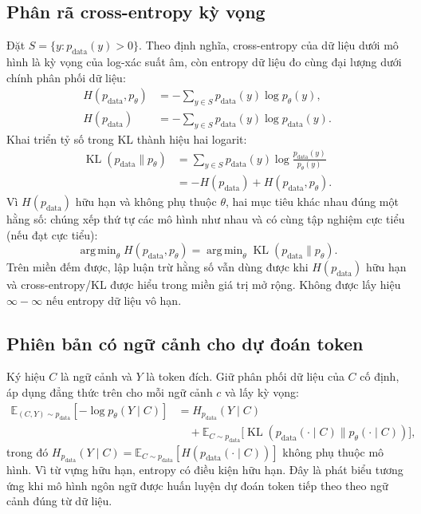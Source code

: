 \documentclass[11pt,a4paper]{article}
\DeclareMathOperator{\KL}{KL}
\DeclareMathOperator*{\argmin}{arg\,min}
\newcommand{\E}{\mathbb{E}}
\newcommand{\pdata}{p_{\mathrm{data}}}
\begin{document}
\subsection*{Phân rã cross-entropy kỳ vọng}
Đặt $S=\{y:\pdata(y)>0\}$. Theo định nghĩa, cross-entropy của dữ liệu dưới mô hình là kỳ vọng của log-xác suất âm, còn entropy dữ liệu đo cùng đại lượng dưới chính phân phối dữ liệu:
\begin{align*}
  H(\pdata,p_\theta)&=-\sum_{y\in S}\pdata(y)\log p_\theta(y),\\
  H(\pdata)&=-\sum_{y\in S}\pdata(y)\log\pdata(y).
\end{align*}
Khai triển tỷ số trong KL thành hiệu hai logarit:
\begin{align*}
  \KL(\pdata\|p_\theta)
   &=\sum_{y\in S}\pdata(y)\log\frac{\pdata(y)}{p_\theta(y)}\\
   &=-H(\pdata)+H(\pdata,p_\theta).
\end{align*}
Vì $H(\pdata)$ hữu hạn và không phụ thuộc $\theta$, hai mục tiêu khác nhau đúng một hằng số: chúng xếp thứ tự các mô hình như nhau và có cùng tập nghiệm cực tiểu (nếu đạt cực tiểu):
\[
  \argmin_\theta H(\pdata,p_\theta)
    =\argmin_\theta \KL(\pdata\|p_\theta).
\]
Trên miền đếm được, lập luận trừ hằng số vẫn dùng được khi $H(\pdata)$ hữu hạn và cross-entropy/KL được hiểu trong miền giá trị mở rộng. Không được lấy hiệu $\infty-\infty$ nếu entropy dữ liệu vô hạn.

\subsection*{Phiên bản có ngữ cảnh cho dự đoán token}
Ký hiệu $C$ là ngữ cảnh và $Y$ là token đích. Giữ phân phối dữ liệu của $C$ cố định, áp dụng đẳng thức trên cho mỗi ngữ cảnh $c$ và lấy kỳ vọng:
\begin{align*}
  \E_{(C,Y)\sim\pdata}[-\log p_\theta(Y\mid C)]
   &= H_{\pdata}(Y\mid C)\\
   &\quad+\E_{C\sim\pdata}\bigl[\KL(\pdata(\cdot\mid C)\|p_\theta(\cdot\mid C))\bigr],
\end{align*}
trong đó $H_{\pdata}(Y\mid C)=\E_{C\sim\pdata}[H(\pdata(\cdot\mid C))]$ không phụ thuộc mô hình. Vì từ vựng hữu hạn, entropy có điều kiện hữu hạn. Đây là phát biểu tương ứng khi mô hình ngôn ngữ được huấn luyện dự đoán token tiếp theo theo ngữ cảnh đúng từ dữ liệu.
\end{document}
